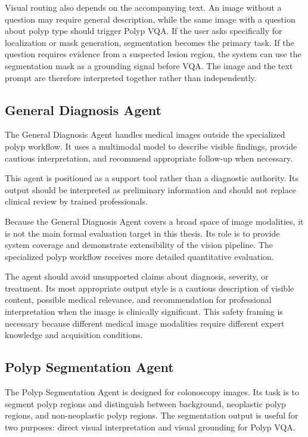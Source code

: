 Visual routing also depends on the accompanying text. An image without a question may require general description, while the same image with a question about polyp type should trigger Polyp VQA. If the user asks specifically for localization or mask generation, segmentation becomes the primary task. If the question requires evidence from a suspected lesion region, the system can use the segmentation mask as a grounding signal before VQA. The image and the text prompt are therefore interpreted together rather than independently.

\subsection{General Diagnosis Agent}

The General Diagnosis Agent handles medical images outside the specialized polyp workflow. It uses a multimodal model to describe visible findings, provide cautious interpretation, and recommend appropriate follow-up when necessary.

This agent is positioned as a support tool rather than a diagnostic authority. Its output should be interpreted as preliminary information and should not replace clinical review by trained professionals.

Because the General Diagnosis Agent covers a broad space of image modalities, it is not the main formal evaluation target in this thesis. Its role is to provide system coverage and demonstrate extensibility of the vision pipeline. The specialized polyp workflow receives more detailed quantitative evaluation.

The agent should avoid unsupported claims about diagnosis, severity, or treatment. Its most appropriate output style is a cautious description of visible content, possible medical relevance, and recommendation for professional interpretation when the image is clinically significant. This safety framing is necessary because different medical image modalities require different expert knowledge and acquisition conditions.

\subsection{Polyp Segmentation Agent}

The Polyp Segmentation Agent is designed for colonoscopy images. Its task is to segment polyp regions and distinguish between background, neoplastic polyp regions, and non-neoplastic polyp regions. The segmentation output is useful for two purposes: direct visual interpretation and visual grounding for Polyp VQA.

